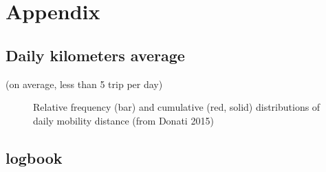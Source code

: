 \section{Appendix}

\subsection{Daily kilometers average}
(on average, less than 5 trip per day)
\begin{figure}[h!]
    \centering
    \hfill
    \caption{Relative frequency (bar) and cumulative (red, solid) distributions of daily mobility distance (from Donati 2015\cite{donati_individual_2015})}
    \label{fig:daily-lenght-travel}
\end{figure}

\newpage 

\subsection{logbook}

